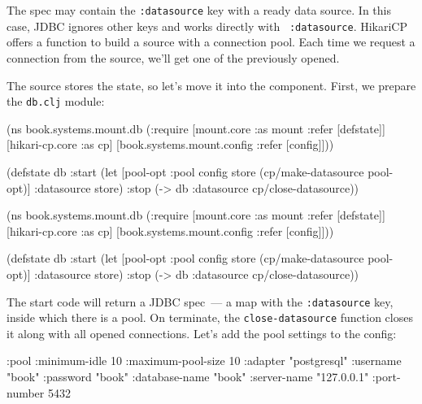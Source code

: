 The spec may contain the \verb|:datasource| key with a ready data source. In this case, JDBC ignores other keys and works directly with ~\verb|:datasource|. HikariCP offers a function to build a source with a connection pool. Each time we request a connection from the source, we'll get one of the previously opened.


The source stores the state, so let's move it into the component. First, we prepare the \verb|db.clj| module:

\ifnarrow

\begin{english}
  \begin{clojure}
(ns book.systems.mount.db
  (:require
   [mount.core :as mount
    :refer [defstate]]
   [hikari-cp.core :as cp]
   [book.systems.mount.config
    :refer [config]]))

(defstate db
  :start
  (let [{pool-opt :pool} config
        store (cp/make-datasource
                pool-opt)]
    {:datasource store})
  :stop
  (-> db
      :datasource
      cp/close-datasource))
  \end{clojure}
\end{english}

\else

\begin{english}
  \begin{clojure}
(ns book.systems.mount.db
  (:require
   [mount.core :as mount :refer [defstate]]
   [hikari-cp.core :as cp]
   [book.systems.mount.config :refer [config]]))

(defstate db
  :start
  (let [{pool-opt :pool} config
        store (cp/make-datasource pool-opt)]
    {:datasource store})
  :stop
  (-> db :datasource cp/close-datasource))
  \end{clojure}
\end{english}

\fi


The start code will return a JDBC spec~--- a map with the \verb|:datasource| key, inside which there is a pool. On terminate, the \verb|close-datasource| function closes it along with all opened connections. Let's add the pool settings to the config:

\begin{english}
  \begin{clojure}
{:pool {:minimum-idle       10
        :maximum-pool-size  10
        :adapter            "postgresql"
        :username           "book"
        :password           "book"
        :database-name      "book"
        :server-name        "127.0.0.1"
        :port-number        5432}}
  \end{clojure}
\end{english}

